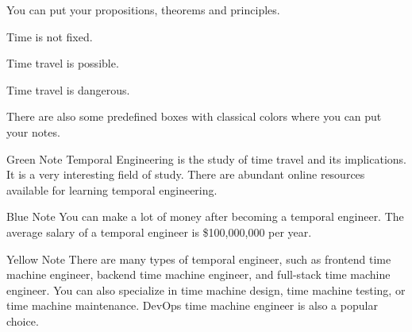 \begin{questionparts}
You can put your propositions, theorems and principles.
\begin{proposition}
    Time is not fixed.
\end{proposition}

\begin{theorem}
    Time travel is possible.
\end{theorem}

\begin{principle}
    Time travel is dangerous.
\end{principle}

There are also some predefined boxes with classical colors where you can put your notes. 
\begin{greenbox}{Green Note}
    Temporal Engineering is the study of time travel and its implications. It is a very interesting field of study. There are abundant online resources available for learning temporal engineering.
\end{greenbox}

\begin{bluebox}{Blue Note}
    You can make a lot of money after becoming a temporal engineer. The average salary of a temporal engineer is \$100,000,000 per year.
\end{bluebox}

\begin{yellowbox}{Yellow Note}
    There are many types of temporal engineer, such as frontend time machine engineer, backend time machine engineer, and full-stack time machine engineer. You can also specialize in time machine design, time machine testing, or time machine maintenance. DevOps time machine engineer is also a popular choice.
\end{yellowbox}

\end{questionparts}